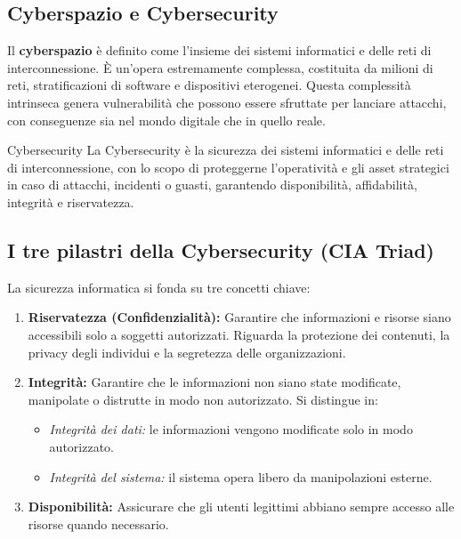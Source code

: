 \documentclass[a4paper,12pt]{article}
\begin{document}
\subsection{Cyberspazio e Cybersecurity}

Il \textbf{cyberspazio} è definito come l'insieme dei sistemi informatici e delle reti di interconnessione. È un'opera estremamente complessa, costituita da milioni di reti, stratificazioni di software e dispositivi eterogenei. Questa complessità intrinseca genera vulnerabilità che possono essere sfruttate per lanciare attacchi, con conseguenze sia nel mondo digitale che in quello reale.

\begin{definizione}{Cybersecurity}
La Cybersecurity è la sicurezza dei sistemi informatici e delle reti di interconnessione, con lo scopo di proteggerne l'operatività e gli asset strategici in caso di attacchi, incidenti o guasti, garantendo disponibilità, affidabilità, integrità e riservatezza.
\end{definizione}

\subsection{I tre pilastri della Cybersecurity (CIA Triad)}

La sicurezza informatica si fonda su tre concetti chiave:

\begin{enumerate}
    \item \textbf{Riservatezza (Confidenzialità):} Garantire che informazioni e risorse siano accessibili solo a soggetti autorizzati. Riguarda la protezione dei contenuti, la privacy degli individui e la segretezza delle organizzazioni.
    \item \textbf{Integrità:} Garantire che le informazioni non siano state modificate, manipolate o distrutte in modo non autorizzato. Si distingue in:
    \begin{itemize}
        \item \textit{Integrità dei dati:} le informazioni vengono modificate solo in modo autorizzato.
        \item \textit{Integrità del sistema:} il sistema opera libero da manipolazioni esterne.
    \end{itemize}
    \item \textbf{Disponibilità:} Assicurare che gli utenti legittimi abbiano sempre accesso alle risorse quando necessario. 
\end{enumerate}
\end{document}
